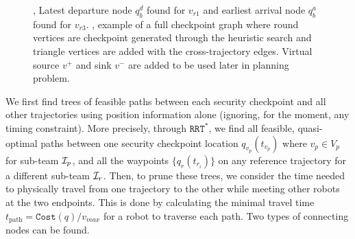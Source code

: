 \documentclass[10pt,twocolumn,twoside]{IEEEtran}
\newcommand{\rrtstar}{$\texttt{RRT}^\texttt{*}$}
\begin{document}
\begin{figure}[htbp]
    \centering
  \caption{, Latest departure node $q^{d}_{b}$ found for $v_{r1}$ and earliest arrival node $q^{a}_{b}$ found for $v_{r3}$. , example of a full checkpoint graph where round vertices are checkpoint generated through the heuristic search and triangle vertices are added with the cross-trajectory edges. Virtual source $v^{+}$ and sink $v^{-}$ are added to be used later in planning problem.}  
\end{figure}


We first find trees of feasible paths between each security checkpoint and all other trajectories using position information alone (ignoring, for the moment, any timing constraint). 
More precisely, through \rrtstar{}, we find all feasible, quasi-optimal paths between one security checkpoint location $q_{v_p}(t_{v_p})$ where $v_{p} \in V_{p}$ for sub-team $\mathcal{I}_p$, and all the waypoints $\{q_{r}(t_{{r}_{i}}) \}$ on any reference trajectory for a different sub-team $\mathcal{I}_{r}$.
Then, to prune these trees, we consider the time needed to physically travel from one trajectory to the other while meeting other robots at the two endpoints. This is done by calculating the minimal travel time $t_{\textrm{path}}=\texttt{Cost}(q)/v_{max}$ for a robot to traverse each path. Two types of connecting nodes can be found.
\end{document}
